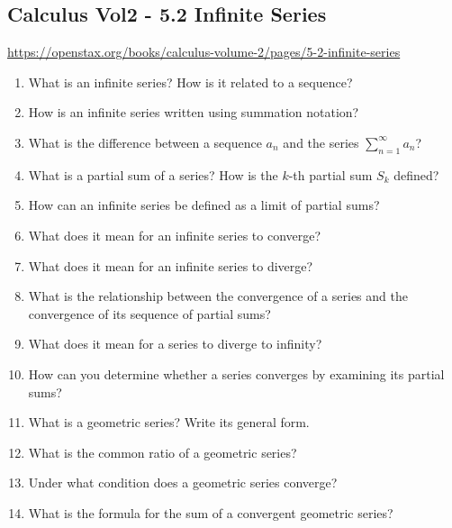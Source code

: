 \subsection{Calculus Vol2 - 5.2 Infinite Series}

\url{https://openstax.org/books/calculus-volume-2/pages/5-2-infinite-series}

\begin{enumerate}

\item What is an infinite series? How is it related to a sequence?

\item How is an infinite series written using summation notation?

\item What is the difference between a sequence ${a_n}$ and the series $\sum_{n=1}^{\infty} a_n$?

\item What is a partial sum of a series? How is the $k$-th partial sum $S_k$ defined?

\item How can an infinite series be defined as a limit of partial sums?

\item What does it mean for an infinite series to converge?

\item What does it mean for an infinite series to diverge?

\item What is the relationship between the convergence of a series and the convergence of its sequence of partial sums?

\item What does it mean for a series to diverge to infinity?

\item How can you determine whether a series converges by examining its partial sums?

\item What is a geometric series? Write its general form.

\item What is the common ratio of a geometric series?

\item Under what condition does a geometric series converge?

\item What is the formula for the sum of a convergent geometric series?


\end{enumerate}
